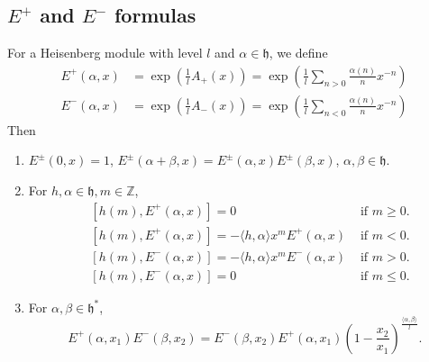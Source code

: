 \documentclass{article}
\theoremstyle{definition}
\newcommand{\Z}{{\mathbb Z}}
\newcommand{\h}{{\mathfrak h}}
\begin{document}
\subsection{$E^+$ and $E^-$ formulas} %
For a Heisenberg module with level $l$ and $\alpha\in \h$, we define 
\begin{align*}
    E^+(\alpha, x)&=\exp\left(\frac 1 l A_+(x)\right) =\exp\left(\frac 1 l \sum_{n>0} \frac{\alpha(n)}{n}x^{-n}\right)\\
    E^-(\alpha, x)&=\exp\left(\frac 1 l A_-(x)\right) =\exp\left(\frac 1 l \sum_{n<0} \frac{\alpha(n)}{n}x^{-n}\right)
\end{align*}
Then 
\begin{enumerate}
    \item $E^\pm(0, x) = 1$, $E^\pm(\alpha+\beta, x) = E^\pm(\alpha, x)E^\pm (\beta, x)$, $\alpha, \beta \in \h$. 
    \item For $h, \alpha \in \h, m \in \Z$, 
    \begin{align*}
        & [h(m), E^+(\alpha, x)]= 0 & \text{ if }m\geq 0. \\
        & [h(m), E^+(\alpha, x)]= -\langle h, \alpha\rangle x^m E^+(\alpha, x) &\text{ if } m<0. \\
        & [h(m), E^-(\alpha, x)]= -\langle h, \alpha\rangle x^m E^-(\alpha, x) &\text{ if } m> 0. \\        
        & [h(m), E^-(\alpha, x)]= 0 & \text{ if }m\leq 0. 
    \end{align*}
    \item For $\alpha, \beta\in \h^*$, 
    $$E^+(\alpha, x_1)E^-(\beta, x_2) = E^-(\beta, x_2)E^+(\alpha, x_1) \left(1-\frac {x_2}{x_1}\right)^{\frac{\langle \alpha, \beta\rangle}{l}}. $$
\end{enumerate}
\end{document}
